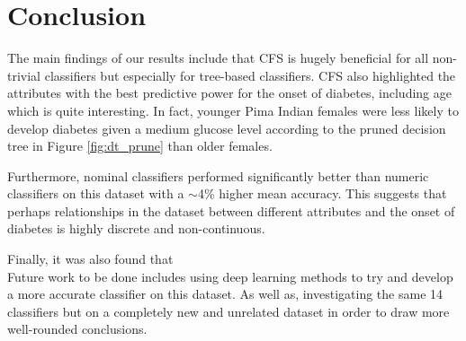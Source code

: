 \section{Conclusion}


The main findings of our results include that CFS is hugely beneficial for all non-trivial classifiers but especially for tree-based classifiers. CFS also highlighted the attributes with the best predictive power for the onset of diabetes, including age which is quite interesting. In fact, younger Pima Indian females were less likely to develop diabetes given a medium glucose level according to the pruned decision tree in Figure \ref{fig:dt_prune} than older females.

Furthermore, nominal classifiers performed significantly better than numeric classifiers on this dataset with a $\sim$4\% higher mean accuracy. This suggests that perhaps relationships in the dataset between different attributes and the onset of diabetes is highly discrete and non-continuous.

Finally, it was also found that 
\\

Future work to be done includes using deep learning methods to try and develop a more accurate classifier on this dataset. As well as, investigating the same 14 classifiers but on a completely new and unrelated dataset in order to draw more well-rounded conclusions.
